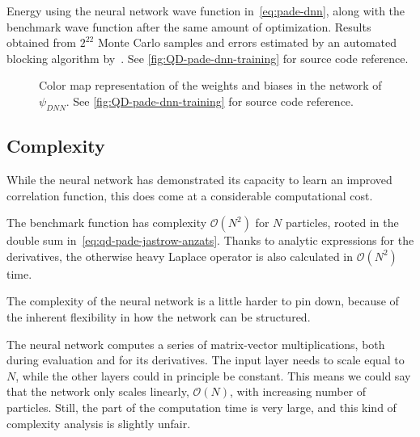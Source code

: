 \documentclass[Thesis.tex]{subfiles}
\begin{document}
\begin{table}[h]
  \centering
  
  \caption{Energy using the neural network wave function in~\cref{eq:pade-dnn}, along with
the benchmark wave function after the same amount of optimization. Results obtained
from $2^{22}$ Monte Carlo samples and errors estimated by an automated blocking
algorithm by~\textcite{Jonsson-2018}. See
\cref{fig:QD-pade-dnn-training} for source code reference.}
  \label{tab:pade-dnn-energy-results}
\end{table}

%         

\begin{figure}[h]
   \centering
    \resizebox{\linewidth}{!}{%
        
    }
    \caption{\label{fig:QD-rbm-symmetry}Color map representation of the weights
      and biases in the network of $\psi_{DNN}$. See
\cref{fig:QD-pade-dnn-training} for source code reference.}
\end{figure}


\subsection{Complexity}

While the neural network has demonstrated its capacity to learn an improved
correlation function, this does come at a considerable computational cost.

The benchmark function has complexity $\mathcal{O}(N^2)$ for $N$ particles,
rooted in the double sum in~\cref{eq:qd-pade-jastrow-anzats}. Thanks to
analytic expressions for the derivatives, the otherwise heavy Laplace operator
is also calculated in $\mathcal{O}(N^2)$ time.

The complexity of the neural network is a little harder to pin down, because of
the inherent flexibility in how the network can be structured.

The neural network computes a series of matrix-vector multiplications, both during
evaluation and for its derivatives. The input layer needs to scale equal to $N$,
while the other layers could in principle be constant. This means we could say
that the network only scales linearly, $\mathcal{O}(N)$, with increasing number
of particles. Still, the  part of the computation time is very
large, and this kind of complexity analysis is slightly unfair.
\end{document}
